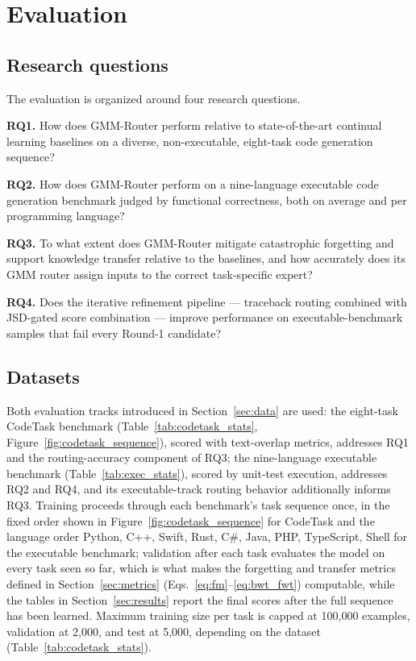\section{Evaluation}
\label{sec:evaluation}

\subsection{Research questions}
\label{sec:rqs}

The evaluation is organized around four research questions.

\noindent\textbf{RQ1.} How does GMM-Router perform relative to state-of-the-art continual learning baselines on a diverse, non-executable, eight-task code generation sequence?

\noindent\textbf{RQ2.} How does GMM-Router perform on a nine-language executable code generation benchmark judged by functional correctness, both on average and per programming language?

\noindent\textbf{RQ3.} To what extent does GMM-Router mitigate catastrophic forgetting and support knowledge transfer relative to the baselines, and how accurately does its GMM router assign inputs to the correct task-specific expert?

\noindent\textbf{RQ4.} Does the iterative refinement pipeline --- traceback routing combined with JSD-gated score combination --- improve performance on executable-benchmark samples that fail every Round-1 candidate?

\subsection{Datasets}
\label{sec:eval_datasets}

Both evaluation tracks introduced in Section~\ref{sec:data} are used: the eight-task CodeTask benchmark (Table~\ref{tab:codetask_stats}, Figure~\ref{fig:codetask_sequence}), scored with text-overlap metrics, addresses RQ1 and the routing-accuracy component of RQ3; the nine-language executable benchmark (Table~\ref{tab:exec_stats}), scored by unit-test execution, addresses RQ2 and RQ4, and its executable-track routing behavior additionally informs RQ3. Training proceeds through each benchmark's task sequence once, in the fixed order shown in Figure~\ref{fig:codetask_sequence} for CodeTask and the language order Python, C++, Swift, Rust, C\#, Java, PHP, TypeScript, Shell for the executable benchmark; validation after each task evaluates the model on every task seen so far, which is what makes the forgetting and transfer metrics defined in Section~\ref{sec:metrics} (Eqs.~\eqref{eq:fm}--\eqref{eq:bwt_fwt}) computable, while the tables in Section~\ref{sec:results} report the final scores after the full sequence has been learned. Maximum training size per task is capped at 100{,}000 examples, validation at 2{,}000, and test at 5{,}000, depending on the dataset (Table~\ref{tab:codetask_stats}).

